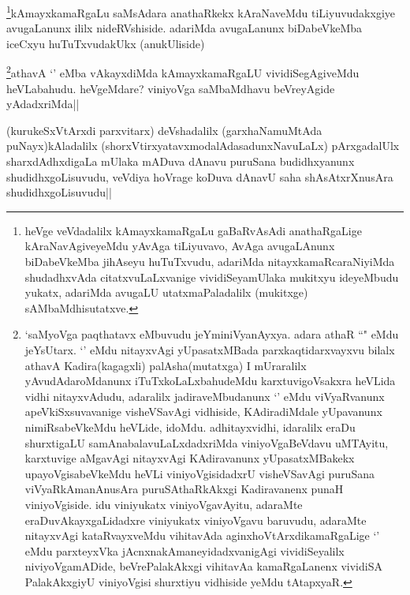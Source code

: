 
\begin{artha}
\footnote{heVge veVdadalilx kAmayxkamaRgaLu gaBaRvAsAdi anathaRgaLige kAraNavAgiveyeMdu yAvAga tiLiyuvavo, AvAga avugaLAnunx biDabeVkeMba jihAseyu huTuTxvudu, adariMda nitayxkamaRcaraNiyiMda shudadhxvAda citatxvuLaLxvanige vividiSeyamUlaka mukitxyu ideyeMbudu yukatx, adariMda avugaLU utatxmaPaladalilx (mukitxge) sAMbaMdhisutatxve.}kAmayxkamaRgaLu saMsAdara anathaRkekx kAraNaveMdu tiLiyuvudakxgiye avugaLanunx ililx nideRVshiside. adariMda avugaLanunx biDabeVkeMba iceCxyu huTuTxvudakUkx (anukUliside)
\end{artha}


\begin{artha}
\footnote{`saMyoVga paqthatavx eMbuvudu jeYminiVyanAyxya. adara athaR ``\stext" eMdu jeYsUtarx. `\stext' eMdu nitayxvAgi yUpasatxMBada parxkaqtidarxvayxvu bilalx athavA Kadira(kagagxli) palAsha(mutatxga) I mUraralilx yAvudAdaroMdanunx iTuTxkoLaLxbahudeMdu karxtuvigoVsakxra heVLida vidhi nitayxvAdudu, adaralilx jadiraveMbudanunx `\stext' eMdu viVyaRvanunx apeVkiSxsuvavanige visheVSavAgi vidhiside, KAdiradiMdale yUpavanunx nimiRsabeVkeMdu heVLide, idoMdu. adhitayxvidhi, idaralilx eraDu shurxtigaLU samAnabalavuLaLxdadxriMda viniyoVgaBeVdavu uMTAyitu, karxtuvige aMgavAgi nitayxvAgi KAdiravanunx yUpasatxMBakekx upayoVgisabeVkeMdu heVLi viniyoVgisidadxrU visheVSavAgi puruSana viVyaRkAmanAnusAra puruSAthaRkAkxgi Kadiravanenx punaH viniyoVgiside. idu viniyukatx viniyoVgavAyitu, adaraMte eraDuvAkayxgaLidadxre viniyukatx viniyoVgavu baruvudu, adaraMte nitayxvAgi kataRvayxveMdu vihitavAda aginxhoVtArxdikamaRgaLige `\stext' eMdu parxteyxVka jAcnxnakAmaneyidadxvanigAgi vividiSeyalilx niviyoVgamADide, beVrePalakAkxgi vihitavAa kamaRgaLanenx vividiSA PalakAkxgiyU viniyoVgisi shurxtiyu vidhiside yeMdu tAtapxyaR.}athavA `\stext' eMba vAkayxdiMda kAmayxkamaRgaLU vividiSegAgiveMdu heVLabahudu. heVgeMdare? viniyoVga saMbaMdhavu beVreyAgide yAdadxriMda||
\end{artha}


\begin{artha}
(kurukeSxVtArxdi parxvitarx) deVshadalilx (garxhaNamuMtAda puNayx)kAladalilx (shorxVtirxyatavxmodalAdasadunxNavuLaLx) pArxgadalUlx sharxdAdhxdigaLa mUlaka mADuva dAnavu puruSana budidhxyanunx shudidhxgoLisuvudu, veVdiya hoVrage koDuva dAnavU saha shAsAtxrXnusAra shudidhxgoLisuvudu||
\end{artha}

